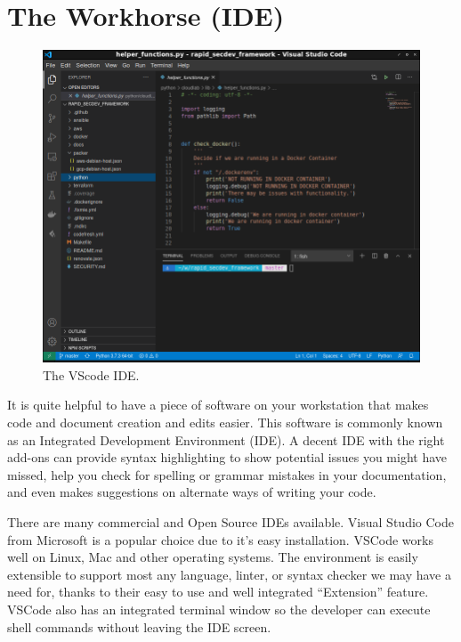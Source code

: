 \section{The Workhorse (IDE)}

\begin{figure}[!htb]
\centering
\includegraphics[scale=0.45]{images/setup-vscode.png}
\caption{The VScode IDE.}
\label{vscode-ide}
\end{figure}

\justify{}
It is quite helpful to have a piece of software on your workstation that makes code and document creation and edits easier. This
software is commonly known as an Integrated Development Environment (IDE). A decent IDE with the right add-ons can
provide syntax highlighting to show potential issues you might have missed, help you check for spelling or
grammar mistakes in your documentation, and even makes suggestions on alternate ways of writing your code.

\justify{}
There are many commercial and Open Source IDEs available. Visual Studio Code from Microsoft is a popular choice due to it's easy
installation. VSCode works well on Linux, Mac and other operating systems.
The environment is easily extensible to support most any language, linter, or syntax checker we may have a need
for, thanks to their easy to use and well integrated ``Extension'' feature. VSCode also has an integrated terminal
window so the developer can execute shell commands without leaving the IDE screen.


